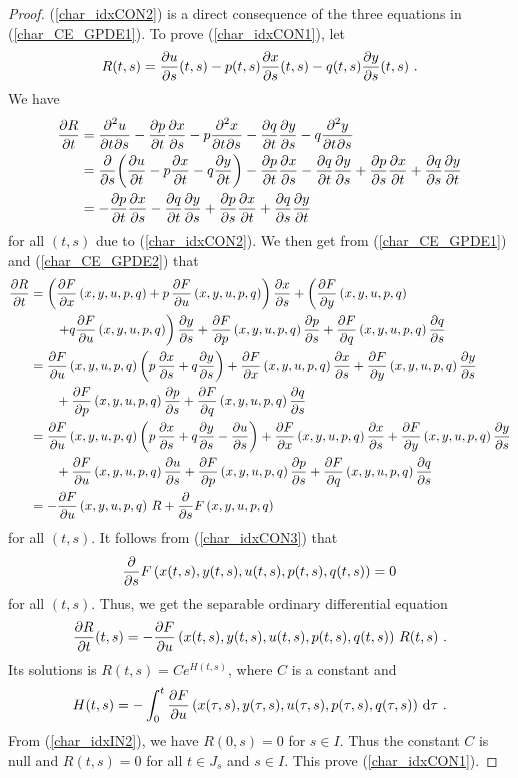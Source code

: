 \begin{proof}
(\ref{char_idxCON2}) is a direct consequence of the three equations in
(\ref{char_CE_GPDE1}).  To prove (\ref{char_idxCON1}), let
\[
R(t,s) = \pdydx{u}{s}(t,s) - p(t,s)\pdydx{x}{s}(t,s)
- q(t,s) \pdydx{y}{s}(t,s) \ . 
\]
We have
\begin{align*}
\pdydx{R}{t} &=
\pdydxnm{u}{t}{s}{2}{}{} - \pdydx{p}{t}\pdydx{x}{s}
- p\pdydxnm{x}{t}{s}{2}{}{} - \pdydx{q}{t}\pdydx{y}{s}
- q\pdydxnm{y}{t}{s}{2}{}{} \\
&= \pdfdx{ \left( \pdydx{u}{t} - p\pdydx{x}{t}
- q \pdydx{y}{t} \right)}{s}
- \pdydx{p}{t}\pdydx{x}{s} - \pdydx{q}{t}\pdydx{y}{s}
+ \pdydx{p}{s}\pdydx{x}{t} + \pdydx{q}{s}\pdydx{y}{t} \\
&= -\pdydx{p}{t}\pdydx{x}{s}
- \pdydx{q}{t}\pdydx{y}{s}
+ \pdydx{p}{s}\pdydx{x}{t}
+ \pdydx{q}{s}\pdydx{y}{t}
\end{align*}
for all $(t,s)$ due to (\ref{char_idxCON2}).  We then get from
(\ref{char_CE_GPDE1}) and (\ref{char_CE_GPDE2}) that
\begin{align*}
\pdydx{R}{t} &=  \left(\pdydx{F}{x}\left(x,y,u,p,q\right)
+ p\,\pdydx{F}{u}\left(x,y,u,p,q\right) \right)\pdydx{x}{s}
+\left(\pdydx{F}{y}\left(x,y,u,p,q\right) \right. \\
& \qquad \left. + q \pdydx{F}{u}\left(x,y,u,p,q\right) \right)\pdydx{y}{s}
+\pdydx{F}{p}\left(x,y,u,p,q\right)\pdydx{p}{s}
+\pdydx{F}{q}\left(x,y,u,p,q\right)\pdydx{q}{s} \\
&=\pdydx{F}{u}\left(x,y,u,p,q\right) \left(p\,\pdydx{x}{s}
+ q\pdydx{y}{s} \right)
+\pdydx{F}{x}\left(x,y,u,p,q\right)\pdydx{x}{s}
+\pdydx{F}{y}\left(x,y,u,p,q\right)\pdydx{y}{s} \\
&\qquad +\pdydx{F}{p}\left(x,y,u,p,q\right)\pdydx{p}{s}
+\pdydx{F}{q}\left(x,y,u,p,q\right)\pdydx{q}{s} \\
&=\pdydx{F}{u}\left(x,y,u,p,q\right) \left( p\,\pdydx{x}{s} +
q\pdydx{y}{s} - \pdydx{u}{s} \right)
+\pdydx{F}{x}\left(x,y,u,p,q\right)\pdydx{x}{s}
+\pdydx{F}{y}\left(x,y,u,p,q\right)\pdydx{y}{s} \\
&\qquad +\pdydx{F}{u}\left(x,y,u,p,q\right)\pdydx{u}{s}
+\pdydx{F}{p}\left(x,y,u,p,q\right)\pdydx{p}{s}
+\pdydx{F}{q}\left(x,y,u,p,q\right)\pdydx{q}{s} \\
&= - \pdydx{F}{u}\left(x,y,u,p,q\right) \,R +
\pdfdx{F\left(x,y,u,p,q\right)}{s}
\end{align*}
for all $(t,s)$.  It follows from (\ref{char_idxCON3}) that
\[
\pdfdx{F\left(x(t,s),y(t,s),u(t,s),p(t,s),q(t,s)\right)}{s} = 0
\]
for all $(t,s)$.  Thus, we get the separable ordinary differential equation
\[
\pdydx{R}{t}(t,s) =
-\pdydx{F}{u}\left(x(t,s),y(t,s),u(t,s),p(t,s),q(t,s)\right) \,R(t,s) \ .
\]
Its solutions is $\displaystyle R(t,s) = C e^{H(t,s)}$, where $C$ is a
constant and
\[
H(t,s) = -\int_0^t
\pdydx{F}{u}\left(x(\tau,s),y(\tau,s),u(\tau,s),p(\tau,s),q(\tau,s)\right)
\dx{\tau} \ .
\]
From (\ref{char_idxIN2}), we have $R(0,s) = 0$ for $s \in I$.  Thus
the constant $C$ is null and $R(t,s) = 0$ for all $t \in J_s$ and
$s\in I$.  This prove (\ref{char_idxCON1}).


\end{proof}
